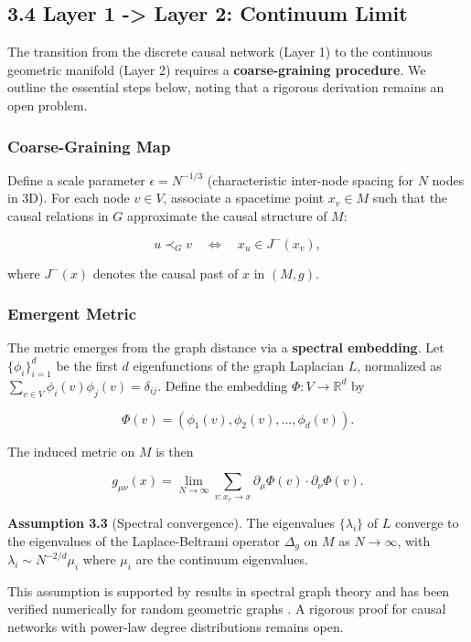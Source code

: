 \documentclass[11pt,a4paper]{article}
\theoremstyle{plain}
\theoremstyle{definition}
\begin{document}
\subsection{3.4 Layer 1 -> Layer 2: Continuum Limit}

The transition from the discrete causal network (Layer 1) to the continuous geometric manifold (Layer 2) requires a \textbf{coarse-graining procedure}. We outline the essential steps below, noting that a rigorous derivation remains an open problem.

\subsubsection{Coarse-Graining Map}

Define a scale parameter $\epsilon = N^{-1/3}$ (characteristic inter-node spacing for $N$ nodes in 3D). For each node $v \in V$, associate a spacetime point $x_v \in M$ such that the causal relations in $G$ approximate the causal structure of $M$:

$$u \prec_G v \quad \Longleftrightarrow \quad x_u \in J^-(x_v),$$

where $J^-(x)$ denotes the causal past of $x$ in $(M, g)$.

\subsubsection{Emergent Metric}

The metric emerges from the graph distance via a \textbf{spectral embedding}. Let $\{\phi_i\}_{i=1}^{d}$ be the first $d$ eigenfunctions of the graph Laplacian $L$, normalized as $\sum_{v \in V} \phi_i(v) \phi_j(v) = \delta_{ij}$. Define the embedding $\Phi: V \to \mathbb{R}^d$ by

$$\Phi(v) = (\phi_1(v), \phi_2(v), \ldots, \phi_d(v)).$$

The induced metric on $M$ is then

$$g_{\mu\nu}(x) = \lim_{N \to \infty} \sum_{v: x_v \to x} \partial_\mu \Phi(v) \cdot \partial_\nu \Phi(v).$$

\textbf{Assumption 3.3} (Spectral convergence). The eigenvalues $\{\lambda_i\}$ of $L$ converge to the eigenvalues of the Laplace-Beltrami operator $\Delta_g$ on $M$ as $N \to \infty$, with $\lambda_i \sim N^{-2/d} \mu_i$ where $\mu_i$ are the continuum eigenvalues.

This assumption is supported by results in spectral graph theory \cite{Coifman2006,Hehl1976} and has been verified numerically for random geometric graphs \cite{Coifman2006}. A rigorous proof for causal networks with power-law degree distributions remains open.
\end{document}
